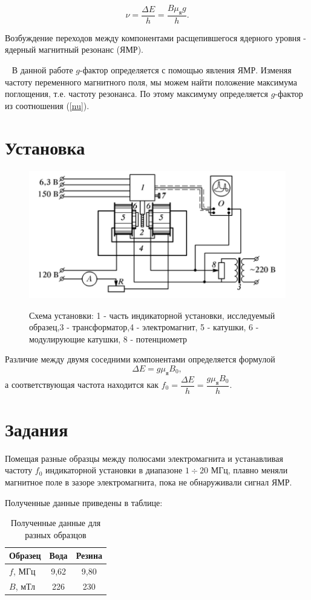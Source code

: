 \documentclass[a4paper,12pt]{article}
\begin{document}
		\begin{equation} \label{nu}
		\nu = \frac{\Delta E}{h} = \frac{B \mu_\text{я} g}{h}.
		\end{equation}
		
		Возбуждение переходов между компонентами расщепившегося ядерного уровня - ядерный магнитный резонанс (ЯМР). 
		
		
		~
		В данной работе $g$-фактор определяется с помощью явления ЯМР. Изменяя частоту переменного магнитного поля, мы можем найти положение максимума поглощения, т.е. частоту резонанса. По этому максимуму определяется $g$-фактор из соотношения (\ref{nu}).
		\newpage
		\section*{Установка}
		\begin{figure}[ht!]
			\centering
			{\includegraphics[width=0.6\linewidth]{scheme.png}}
			\caption{Схема установки: 1 - часть индикаторной установки, исследуемый образец,3 - трансформатор,4 - электромагнит, 5 - катушки, 6 - модулирующие катушки, 8 - потенциометр }
		\end{figure}
		Различие между двумя соседними компонентами определяется формулой $$\Delta E = g\mu_{\text{я}}B_0,$$ а соответствующая частота находится как $f_0 = \dfrac{\Delta E}{h} = \dfrac{g\mu_{\text{я}}B_0}{h}$.
		\section*{Задания}
		Помещая разные образцы между полюсами электромагнита и устанавливая частоту $f_0$ индикаторной установки в диапазоне $1\div20$ МГц, плавно меняли магнитное поле в зазоре электромагнита, пока не обнаруживали сигнал ЯМР.
		
		Полученные данные приведены в таблице:
		
		\begin{table} [h]
			\centering
			\caption{Полученные данные для разных образцов}
			\begin{tabular}{|l||c|c|}
				\hline
				Образец  & Вода & Резина \\
				\hline
				$f$, МГц & 9,62 & 9,80 \\
				\hline
				$B$, мТл & 226 & 230 \\
				\hline
			\end{tabular}
		\end{table}
		
\end{document}
